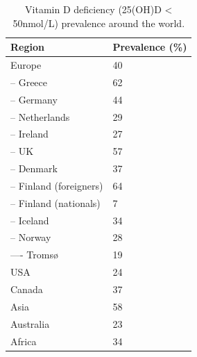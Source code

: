 \begin{table}[h! ]

    \caption{Vitamin D deficiency (25(OH)D < 50nmol/L) prevalence around the world.}	
	\centering

	\begin{tabular}{|ll|}
	\hline
	\rowcolor[HTML]{FFCCCC} 
	Region                  & Prevalence (\%) \\ \hline

	Europe \cite{ref:B_Amrein2020}                 & 40              \\
	\rowcolor[HTML]{EFEFEF} 
	-- Greece \cite{ref:A_Cashman2016}              & 62              \\
	-- Germany \cite{ref:A_Cashman2016}              & 44              \\
	\rowcolor[HTML]{EFEFEF} 
	-- Netherlands \cite{ref:A_Cashman2016}          & 29              \\
	-- Ireland \cite{ref:A_Cashman2016}              & 27              \\
	\rowcolor[HTML]{EFEFEF} 
	-- UK  \cite{ref:A_Cashman2016}                 & 57              \\
	-- Denmark \cite{ref:A_Cashman2016}             & 37              \\
	\rowcolor[HTML]{EFEFEF} 
	-- Finland (foreigners) \cite{ref:A_Cashman2016} & 64              \\
	-- Finland (nationals) \cite{ref:A_Cashman2016}  & 7               \\
	\rowcolor[HTML]{EFEFEF} 
	-- Iceland      \cite{ref:A_Cashman2016}        & 34              \\
	-- Norway  \cite{ref:A_Cashman2016}             & 28              \\
	\rowcolor[HTML]{EFEFEF} 
	---- Tromsø   \cite{ref:A_Cashman2016}          & 19              \\
	
	USA \cite{ref:B_Amrein2020}                    & 24              \\
	\rowcolor[HTML]{EFEFEF} 
	Canada \cite{ref:B_Amrein2020}                  & 37              \\	
	
	Asia \cite{ref:C_Jiang2021}                    & 58              \\
	\rowcolor[HTML]{EFEFEF} 
	Australia    \cite{ref:A_Cashman2016}           & 23              \\
	Africa  \cite{ref:D_Mogire2020}                & 34              \\ \hline
	
	\end{tabular}
	\label{tab:vitDeficiencyTable}
	
	
\end{table}

